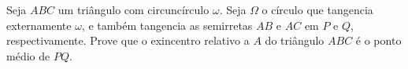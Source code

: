 Seja $ABC$ um triângulo com circuncírculo $\omega$. Seja $\Omega$ o círculo que tangencia externamente $\omega$, e também tangencia as semirretas $AB$ e $AC$ em $P$ e $Q$, respectivamente. Prove que o exincentro relativo a $A$ do triângulo $ABC$ é o ponto médio de $PQ$.

